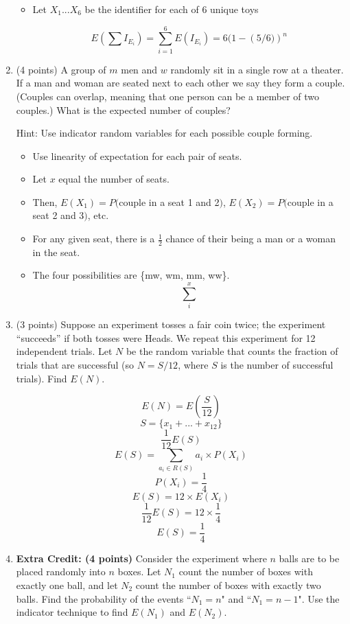 \documentclass[11pt]{article}
\begin{document}
\begin{enumerate}
\begin{itemize}
	\item Let $X_1 ... X_6$ be the identifier for each of 6 unique toys
	
	\[ E\left(\sum I_{E_i}\right) = \sum_{i = 1}^6 E(I_{E_i}) = 6(1 - \left(5/6)\right)^n \]

\end{itemize}

\item (4 points) A group of $m$ men and $w$ randomly sit in a single row at a
theater.  If a man and woman are seated next to each other we say they form a
couple.  (Couples can overlap, meaning that one person can be a member of two
couples.)  What is the expected number of couples?
\begin{small}\textsf{Hint: Use indicator
random variables for each possible couple forming.
}\end{small}

\begin{itemize}

	\item Use linearity of expectation for each pair of seats.
	\item Let $x$ equal the number of seats.
	\item Then, $E(X_1) = P($couple in a seat 1 and 2$)$, $E(X_2) = P($couple in a seat 2 and 3$)$, etc.
	\item For any given seat, there is a $\frac{1}{2}$ chance of their being a man or a woman in the seat.
	\item The four possibilities are \{mw, wm, mm, ww\}.
		  \[\sum_{i}^{x} \]

\end{itemize}

\item (3 points) Suppose an experiment tosses a fair coin twice;  the experiment
``succeeds'' if both tosses were Heads.  We repeat this experiment 
for 12 independent trials.  Let $N$ be the random variable that counts
the fraction of trials that are successful (so $N = S/12$, where
$S$ is the number of successful trials).  Find $E(N)$.


	\[ E(N) = E\left(\frac{S}{12}\right) \]
	\[ S = \{ x_1 + ... + x_12 \} \]
	\[\frac{1}{12} E(S) \]
	\[E(S) = \sum_{a_i \in R(S)} a_i \times P(X_i) \]
	\[P(X_i) = \frac{1}{4} \]
	\[E(S) = 12 \times E(X_i) \]
	\[\frac{1}{12}E(S) = 12 \times \frac{1}{4} \]
	\[ E(S) = \frac{1}{4} \]


\item \textbf{Extra Credit: (4 points)} Consider the experiment where $n$ balls
are to be placed randomly into $n$ boxes. Let $N_1$ count the number of boxes
with exactly one ball, and let $N_2$ count the number of boxes with exactly two
balls. Find the probability of the events ``$N_1 = n$" and ``$N_1 = n - 1$".
Use the indicator technique to find $E(N_1)$ and $E(N_2)$.


\end{enumerate}
\end{document}
